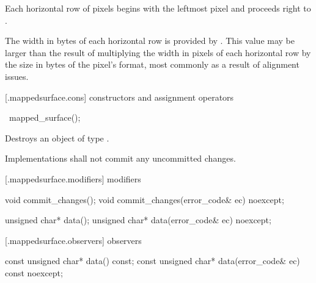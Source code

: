 \pnum
Each horizontal row of pixels begins with the leftmost pixel and proceeds right to .

\pnum
The width in bytes of each horizontal row is provided by . This value may be larger than the result of multiplying the width in pixels of each horizontal row by the size in bytes of the pixel's format, most commonly as a result of alignment issues.

 [\iotwod.mappedsurface.cons] { constructors and assignment operators}

\begin{itemdecl}
    ~mapped_surface();
\end{itemdecl}
\begin{itemdescr}
	\pnum
	\effects
	Destroys an object of type . 
	
	\pnum
	\remarks
	Implementations shall not commit any uncommitted changes.
		
\end{itemdescr}

 [\iotwod.mappedsurface.modifiers]{ modifiers}

\begin{itemdecl}
    void commit_changes();
    void commit_changes(error_code& ec) noexcept;
\end{itemdecl}
\begin{itemdescr}
	\pnum
	\postconditions
	
\end{itemdescr}

\begin{itemdecl}
    unsigned char* data();
    unsigned char* data(error_code& ec) noexcept;
\end{itemdecl}
\begin{itemdescr}
	\pnum
	\postconditions
	
\end{itemdescr}

 [\iotwod.mappedsurface.observers]{ observers}

\begin{itemdecl}
    const unsigned char* data() const;
    const unsigned char* data(error_code& ec) const noexcept;
\end{itemdecl}
\begin{itemdescr}
	\pnum
	\returns

\end{itemdescr}

